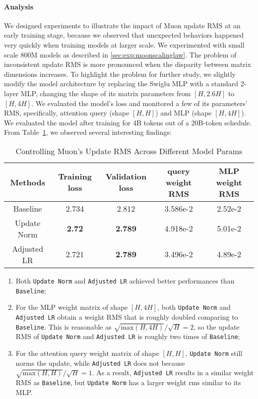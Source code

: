 \paragraph{Analysis}
We designed experiments to illustrate the impact of Muon update RMS at an early training stage, because we observed that unexpected behaviors happened very quickly when training models at larger scale. We experimented with small scale 800M models as described in \ref{sec:exp:moonscalinglaw}. The problem of inconsistent update RMS is more pronounced when the disparity between matrix dimensions increases. To highlight the problem for further study, we slightly modify the model architecture by replacing the Swiglu MLP with a standard 2-layer MLP, changing the shape of its matrix parameters from $[H, 2.6H]$ to $[H, 4H]$. We evaluated the model's loss and monitored a few of its parameters' RMS, specifically, attention query (shape $[H, H]$) and MLP (shape $[H, 4H]$). We evaluated the model after training for 4B tokens out of a 20B-token schedule. From Table~\ref{tab:muon-params-rms}, we observed several interesting findings:


\begin{table}[t]
\small
\centering
\caption{Controlling Muon's Update RMS Across Different Model Params}
\label{tab:muon-params-rms}
\begin{tabular}{c|c|c|c|c}
\toprule
Methods & Training loss & Validation loss & query weight RMS & MLP weight RMS \\
\midrule
Baseline & 2.734 & 2.812 & 3.586e-2 & 2.52e-2 \\
Update Norm & \textbf{2.72} & \textbf{2.789} & 4.918e-2 & 5.01e-2 \\
Adjusted LR & 2.721 & \textbf{2.789} & 3.496e-2 & 4.89e-2 \\
\bottomrule
\end{tabular}
\end{table}

\begin{enumerate}
    \item Both \texttt{Update Norm} and \texttt{Adjusted LR} achieved better performances than \texttt{Baseline};
    
    \item For the MLP weight matrix of shape $[H, 4H]$, both \texttt{Update Norm} and \texttt{Adjusted LR} obtain a weight RMS that is roughly doubled comparing to \texttt{Baseline}. This is reasonable as $\sqrt{\text{max}(H,4H)} / \sqrt{H} = 2$, so the update RMS of \texttt{Update Norm} and \texttt{Adjusted LR} is roughly two times of \texttt{Baseline};
    
    \item For the attention query weight matrix of shape $[H, H]$, \texttt{Update Norm} still norms the update, while \texttt{Adjusted LR} does not because $\sqrt{\text{max}(H,H)} / \sqrt{H} = 1$. As a result, \texttt{Adjusted LR} results in a similar weight RMS as \texttt{Baseline}, but \texttt{Update Norm} has a larger weight rms similar to its MLP.
\end{enumerate}

